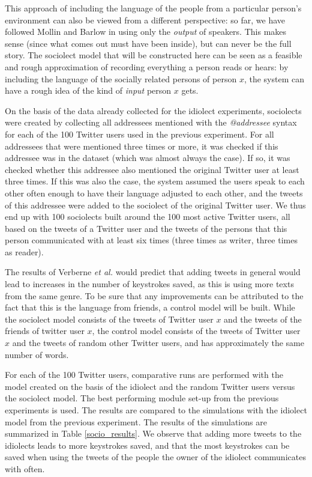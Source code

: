 \documentclass[11pt]{article}
\begin{document}
{This approach of including the language of the people from a particular person's environment can also be viewed from a different perspective: so far, we have followed Mollin  and Barlow in using only the \emph{output} of speakers. This makes sense (since what comes out must have been inside), but can never be the full story. The sociolect model that will be constructed here can be seen as a feasible and rough approximation of recording everything a person reads or hears: by including the language of the socially related persons of person $x$, the system can have a rough idea of the kind of \emph{input} person $x$ gets.

On the basis of the data already collected for the idiolect experiments, sociolects were created by collecting all addressees mentioned with the \emph{@addressee} syntax for each of the 100 Twitter users used in the previous experiment. For all addressees that were mentioned three times or more, it was checked if this addressee was in the dataset (which was almost always the case). If so, it was checked whether this addressee also mentioned the original Twitter user at least three times. If this was also the case, the system assumed the users speak to each other often enough to have their language adjusted to each other, and the tweets of this addressee were added to the sociolect of the original Twitter user. We thus end up with 100 sociolects built around the 100 most active Twitter users, all based on the tweets of a Twitter user and the tweets of the persons that this person communicated with at least six times (three times as writer, three times as reader).

The results of Verberne {\em et al.}  would predict that adding tweets in general would lead to increases in the number of keystrokes saved, as this is using more texts from the same genre. To be sure that any improvements can be attributed to the fact that this is the language from friends, a control model will be built. While the sociolect model consists of the tweets of Twitter user $x$ and the tweets of the friends of twitter user $x$, the control model consists of the tweets of Twitter user $x$ and the tweets of random other Twitter users, and has approximately the same number of words.

For each of the 100 Twitter users, comparative runs are performed with the model created on the basis of the idiolect and the random Twitter users versus the sociolect model. The best performing module set-up from the previous experiments is used.  The results are compared to the simulations with the idiolect model from the previous experiment. The results of the simulations are summarized in Table \ref{socio_results}.
We observe that adding more tweets to the idiolects leads to more keystrokes saved, and that the most keystrokes can be saved when using the tweets of the people the owner of the idiolect communicates with often.

}
\end{document}
